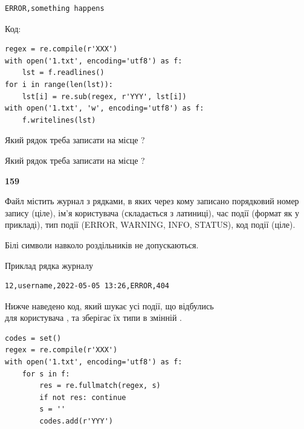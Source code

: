 \begin{verbatim}
ERROR,something happens
\end{verbatim}




Код:



\begin{verbatim}
regex = re.compile(r'XXX')
with open('1.txt', encoding='utf8') as f:
    lst = f.readlines()
for i in range(len(lst)):
    lst[i] = re.sub(regex, r'YYY', lst[i])
with open('1.txt', 'w', encoding='utf8') as f:
    f.writelines(lst)
\end{verbatim}









Який рядок треба записати на місце  ?\par
\vspace{5mm}


Який рядок треба записати на місце  ?\par


\newpage

{\begin {center}\textbf{ 159}\end {center}}\par
Файл  містить журнал з рядками, в яких через кому записано поряд\-ко\-вий номер запису (ціле), ім'я користувача (складається з латиниці), час події (фор\-мат як у прикладі), тип події (ERROR, WARNING, INFO, STATUS), код події (ціле).

Білі символи навколо роздільників не допускаються.

Приклад рядка журналу



\begin{verbatim}
12,username,2022-05-05 13:26,ERROR,404
\end{verbatim}


Нижче наведено код, який шукає усі події, що відбулись\\ для користувача , та зберігає їх типи в змінній .



\begin{verbatim}
codes = set()
regex = re.compile(r'XXX')
with open('1.txt', encoding='utf8') as f:
    for s in f:
        res = re.fullmatch(regex, s)
        if not res: continue
        s = ''
        codes.add(r'YYY')
\end{verbatim}





